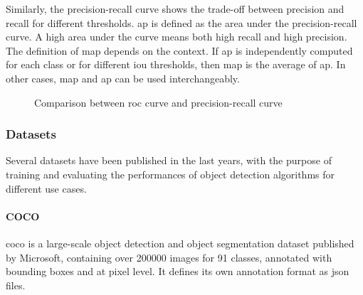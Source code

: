 \documentclass[%
    corpo=12pt,
    twoside,
    stile=classica,   
    tipotesi=magistrale,
    evenboxes,
    english,
	numerazioneromana,
]{toptesi}
\begin{document}
\medskip
Similarly, the precision-recall curve shows the trade-off between precision and recall for different thresholds\cite{precrecall}. \gls{ap} is defined as the area under the precision-recall curve. A high area under the curve means both high recall and high precision. The definition of \gls{map} depends on the context. If \gls{ap} is independently computed for each class or for different \gls{iou} thresholds, then \gls{map} is the average of \gls{ap}. In other cases, \gls{map} and \gls{ap} can be used interchangeably.

\begin{figure}[ht]
	\centering
	\caption{Comparison between \gls{roc} curve and precision-recall curve}
	\label{fig:roc_map}
\end{figure}

\subsubsection{Datasets}\label{sec:datasets}
Several datasets have been published in the last years, with the purpose of training and evaluating the performances of object detection algorithms for different use cases.

\paragraph{COCO}\label{sec:coco}
\gls{coco} is a large-scale object detection and object segmentation dataset published by Microsoft, containing over 200000 images for 91 classes, annotated with bounding boxes and at pixel level\cite{lin2015microsoft}. It defines its own annotation format as \acrshort{json} files.
\end{document}
